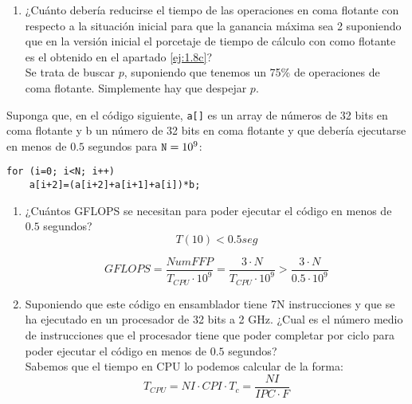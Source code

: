 \begin{ejercicio}
\begin{enumerate}
        \item ¿Cuánto debería reducirse el tiempo de las operaciones en coma flotante con respecto a la situación
        inicial para que la ganancia máxima sea 2 suponiendo que en la versión inicial el porcetaje de tiempo de
        cálculo con como flotante es el obtenido en el apartado \ref{ej:1.8c}?\\

        Se trata de buscar $p$, suponiendo que tenemos un 75\% de operaciones de coma flotante. Simplemente hay que despejar $p$.

    \end{enumerate}
\end{ejercicio}

\begin{ejercicio}
    Suponga que, en el código siguiente, \verb|a[]| es un array de números de 32 bits en coma flotante y b
    un número de 32 bits en coma flotante y que debería ejecutarse en menos de $0.5$ segundos para $\verb|N|=10^9$:
    \begin{verbatim}
for (i=0; i<N; i++)
    a[i+2]=(a[i+2]+a[i+1]+a[i])*b;
    \end{verbatim}

    \begin{enumerate}
        \item ¿Cuántos GFLOPS se necesitan para poder ejecutar el código en menos de $0.5$ segundos?\\

        \begin{equation*}
            T(10) < 0.5 seg
        \end{equation*}

        \begin{equation*}
            GFLOPS = \dfrac{Num FFP}{T_{CPU}\cdot 10^9} = \dfrac{3\cdot N}{T_{CPU}\cdot 10^9} > \dfrac{3\cdot N}{0.5\cdot 10^9}
        \end{equation*}

        \item Suponiendo que este código en ensamblador tiene 7N instrucciones y que se ha ejecutado en un
        procesador de 32 bits a 2 GHz. ¿Cual es el número medio de instrucciones que el procesador tiene que poder
        completar por ciclo para poder ejecutar el código en menos de $0.5$ segundos?\\

        Sabemos que el tiempo en CPU lo podemos calcular de la forma:
        \begin{equation*}
            T_{CPU} = NI \cdot CPI \cdot T_c = \dfrac{NI}{IPC \cdot F}
        \end{equation*}


\end{enumerate}
\end{ejercicio}
